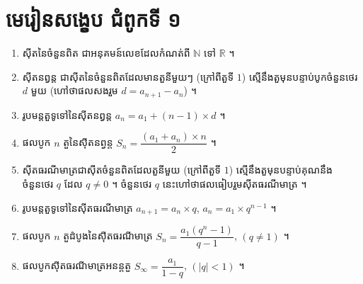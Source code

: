 \section*{មេរៀនសង្ខេប ជំពូកទី ១}
\begin{note}[មេរៀនសង្ខេប]
\begin{enumerate}[1]
  \item ស៊ីតនៃចំនួនពិត ជាអនុគមន៍លេខដែលកំណត់ពី $\mathbb{N}$ ទៅ $\mathbb{R}$ ។
  \item ស៊ីតនព្វន្ត ជាស៊ីតនៃចំនួនពិតដែលមានតួនីមួយៗ (ក្រៅពីតួទី $1$) ស្មើនឹងតួមុនបន្ទាប់បូកចំនួនថេរ $d$ មួយ (ហៅថាផលសងរួម $d = a_{n+1} - a_n$) ។
  \item រូបមន្តតួទូទៅនៃស៊ីតនព្វន្ត $a_n = a_1 + (n - 1)\times d$ ។
  \item ផលបូក $n$ តួនៃស៊ីតនព្វន្ត $S_n = \dfrac{(a_1 + a_n)\times n}{2}$ ។
  \item ស៊ីតធរណីមាត្រជាស៊ីតចំនួនពិតដែលតួនីមួយ (ក្រៅពីតួទី $1$) ស្មើនឹងតួមុនបន្ទាប់គុណនឹងចំនួនថេរ $q$ ដែល $q \ne 0$ ។ ចំនួនថេរ $q$ នេះហៅថាផលធៀបរួមស៊ីតធរណីមាត្រ ។
  \item រូបមន្តតួទូទៅនៃស៊ីតធរណីមាត្រ $a_{n+1} = a_n\times q$, $a_n = a_1\times q^{n-1}$ ។
  \item ផលបូក $n$ តួដំបូងនៃស៊ីតធរណីមាត្រ $S_n = \dfrac{a_1(q^n - 1)}{q - 1}$, $(q \ne 1)$ ។
  \item ផលបូកស៊ីតធរណីមាត្រអនន្តតួ $S_\infty = \dfrac{a_1}{1 - q}$, $(|q| < 1)$ ។
\end{enumerate}
\end{note}

